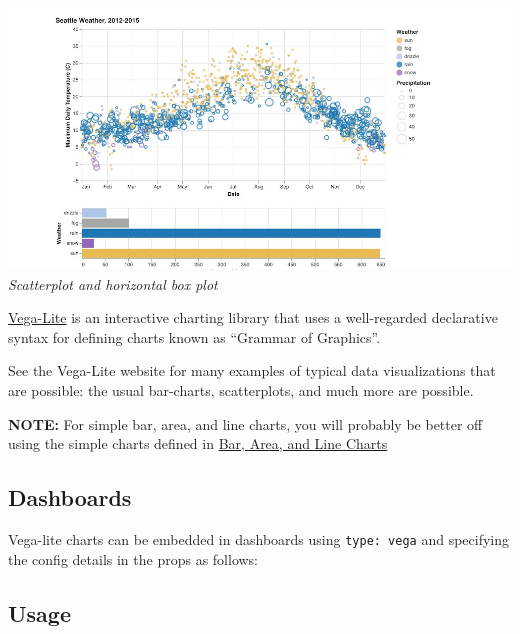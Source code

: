 \includegraphics{assets/vega-chart.jpg} \emph{Scatterplot and horizontal
box plot}

\href{https://vega.github.io/vega-lite/}{Vega-Lite} is an interactive
charting library that uses a well-regarded declarative syntax for
defining charts known as ``Grammar of Graphics''.

See the Vega-Lite website for many examples of typical data
visualizations that are possible: the usual bar-charts, scatterplots,
and much more are possible.

\textbf{NOTE:} For simple bar, area, and line charts, you will probably
be better off using the simple charts defined in
\href{bar-area-line}{Bar, Area, and Line Charts}

\hypertarget{dashboards}{%
\subsection{Dashboards}\label{dashboards}}

Vega-lite charts can be embedded in dashboards using
\texttt{type:\ vega} and specifying the config details in the props as
follows:

\begin{Shaded}
\begin{Highlighting}[]
\KeywordTok{:}
\AttributeTok{  }\KeywordTok{{-}}\AttributeTok{ }\KeywordTok{:}
\AttributeTok{    }\KeywordTok{:}
\AttributeTok{    }\KeywordTok{:}
\end{Highlighting}
\end{Shaded}

\hypertarget{usage}{%
\subsection{Usage}\label{usage}}

